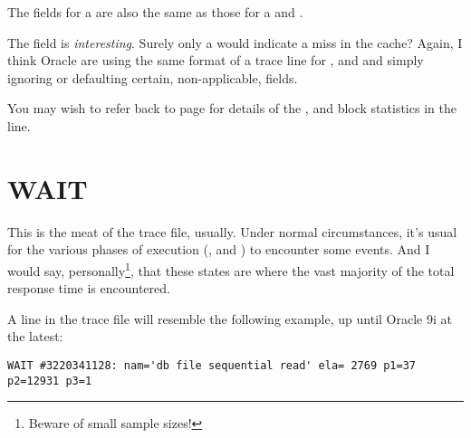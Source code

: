 The fields for a  are also the same as those for a  and .

The  field is \emph{interesting}. Surely only a  would indicate a miss in the cache? Again, I think Oracle are using the same format of a trace line for ,  and  and simply ignoring or defaulting certain, non-applicable, fields.

You may wish to refer back to page \pageref{block-details} for details of the ,  and  block statistics in the  line.

\newpage\section{WAIT}\label{wait}

This is the meat of the trace file, usually. Under normal circumstances, it's usual for the various phases of execution (,  and ) to encounter some  events. And I would say, personally\footnote{Beware of   small sample sizes!}, that these  states are where the vast majority of the total response time is encountered.

A  line in the trace file will resemble the following example, up until Oracle 9i at the latest:

\begin{lstlisting}[numbers=none,caption={Wait Line - Oracle 9i}]
WAIT #3220341128: nam='db file sequential read' ela= 2769 p1=37 p2=12931 p3=1
\end{lstlisting}

